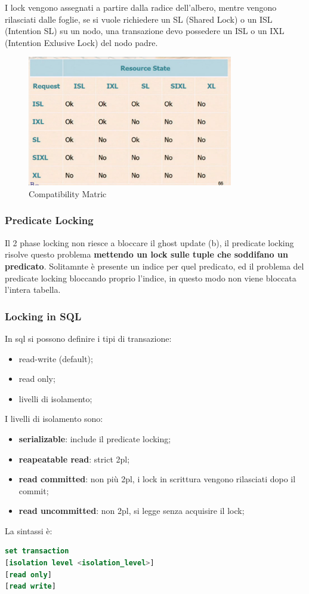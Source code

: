\documentclass[12pt]{article}
\begin{document}
I lock vengono assegnati a partire dalla radice dell'albero, mentre vengono rilasciati dalle foglie, se si vuole richiedere un SL (Shared Lock) o un ISL (Intention SL) su un nodo, una transazione devo possedere un ISL o un IXL (Intention Exlusive Lock) del nodo padre.
\begin{figure}[H]
    \centering
    \includegraphics[width=0.8\textwidth]{compatibility-matric.png}
    \caption{Compatibility Matric}
    \label{fig:compatibility-matric}
\end{figure}


\subsubsection{Predicate Locking}
Il 2 phase locking non riesce a bloccare il ghost update (b), il predicate locking risolve questo problema \textbf{mettendo un lock sulle tuple che soddifano un predicato}. Solitamnte \`e presente un indice per quel predicato, ed il problema del predicate locking bloccando proprio l'indice, in questo modo non viene bloccata l'intera tabella.


\subsubsection{Locking in SQL}
In sql si possono definire i tipi di transazione:
\begin{itemize}
    \item read-write (default);
    \item read only;
    \item livelli di isolamento;
\end{itemize}
I livelli di isolamento sono:
\begin{itemize}
    \item \textbf{serializable}: include il predicate locking;
    \item \textbf{reapeatable read}: strict 2pl;
    \item \textbf{read committed}: non pi\`u 2pl, i lock in scrittura vengono rilasciati dopo il commit;
    \item \textbf{read uncommitted}: non 2pl, si legge senza acquisire il lock;
\end{itemize}
La sintassi \`e:
\begin{lstlisting}[language=sql]
set transaction
[isolation level <isolation_level>]
[read only]
[read write]
\end{lstlisting}
\end{document}
